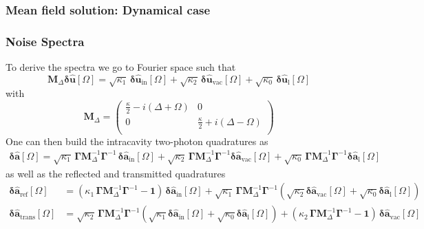 \subsubsection{Mean field solution: Dynamical case}



\subsubsection{Noise Spectra} 
To derive the spectra we go to Fourier space such that 
\begin{equation}
     \mathbf{M}_\Delta \mathbf{\delta \hat{u}}[\Omega]  = \sqrt{\kappa_{\mathrm{1}}} \, \mathbf{\delta \hat{u}_{\mathrm{in}}}[\Omega]  + \sqrt{\kappa_2} \, \mathbf{\delta \hat{u}_{\mathrm{vac}}}[\Omega]   + \sqrt{\kappa_0} \, \mathbf{\delta \hat{u}_{\mathrm{l}}}[\Omega]   
\end{equation}
with 
\begin{equation}
  \mathbf{M}_\Delta =\begin{pmatrix}
  \frac{\kappa}{2}-i(\Delta+\Omega) & 0 \\ 
  0 & \frac{\kappa}{2}+i(\Delta-\Omega)\\ 
  \end{pmatrix} 
\end{equation}
One can then build the intracavity two-photon quadratures as 
\begin{equation}
  \begin{split}
  \mathbf{\delta \hat{a}}[\Omega]  = \sqrt{\kappa_1} \, \mathbf{\Gamma} \mathbf{M}^{-1}_\Delta \mathbf{\Gamma}^{-1}\, \mathbf{\delta \hat{a}_{\mathrm{in}}}[\Omega] +  \sqrt{\kappa_2} \,\mathbf{\Gamma}  \mathbf{M}^{-1}_\Delta \mathbf{\Gamma}^{-1} \mathbf{\delta \hat{a}_{\mathrm{vac}}}[\Omega] +  \sqrt{\kappa_0} \,\mathbf{\Gamma}  \mathbf{M}^{-1}_\Delta \mathbf{\Gamma}^{-1} \mathbf{\delta \hat{a}_{\mathrm{l}}}[\Omega] 
\end{split}
\end{equation}
as well as the reflected and transmitted quadratures 
\begin{equation}
  \begin{split}
  \mathbf{\delta \hat{a}_{\mathrm{ref}}}[\Omega]  &= ( \kappa_1 \, \mathbf{\Gamma} \mathbf{M}^{-1}_\Delta \mathbf{\Gamma}^{-1}- \mathbf{1} )\, \mathbf{\delta \hat{a}_{\mathrm{in}}}[\Omega] +  \sqrt{\kappa_1} \,\mathbf{\Gamma}  \mathbf{M}^{-1}_\Delta \mathbf{\Gamma}^{-1} (\sqrt{\kappa_2} \mathbf{\delta \hat{a}_{\mathrm{vac}}}[\Omega] + \sqrt{\kappa_0}  \mathbf{\delta \hat{a}_{\mathrm{l}}}[\Omega] ) \\
  \mathbf{\delta \hat{a}_{\mathrm{trans}}}[\Omega] & =  \sqrt{\kappa_2} \,\mathbf{\Gamma}  \mathbf{M}^{-1}_\Delta \mathbf{\Gamma}^{-1} (\sqrt{\kappa_1} \mathbf{\delta \hat{a}_{\mathrm{in}}}[\Omega] + \sqrt{\kappa_0}  \mathbf{\delta \hat{a}_{\mathrm{l}}}[\Omega] ) +  (\kappa_2 \,\mathbf{\Gamma}  \mathbf{M}^{-1}_\Delta \mathbf{\Gamma}^{-1}- \mathbf{1}) \, \mathbf{\delta \hat{a}_{\mathrm{vac}}}[\Omega] 
  \end{split}
\end{equation}


